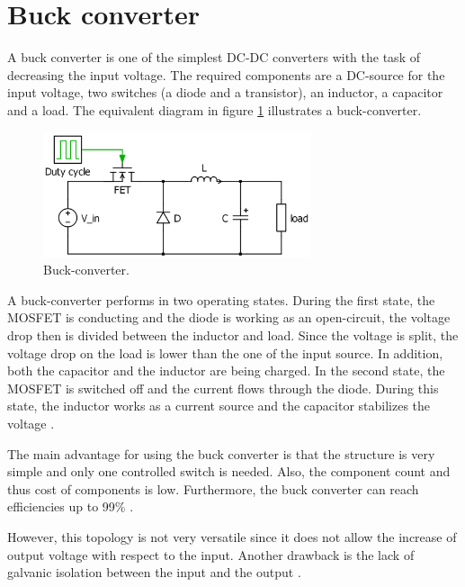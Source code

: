 \section{Buck converter\label{Buck-C}}

A buck converter is one of the simplest DC-DC converters with the task of decreasing the input voltage. The required components are a DC-source for the input voltage, two switches (a diode and a transistor), an inductor, a capacitor and a load. The equivalent diagram in figure \ref{Buck-converter} illustrates a buck-converter. 

\begin{figure}[htbp]
	\begin{center}
		\includegraphics[width=0.7\textwidth]{../Pictures/Buck-converter}
		\caption{Buck-converter.}
		\label{Buck-converter}
	\end{center}	
\end{figure}

A buck-converter performs in two operating states. 
During the first state, the MOSFET is conducting and the diode is working as an open-circuit, the voltage drop  then is divided between the inductor and load. Since the voltage is split, the voltage drop on the load is lower than the one of the input source. In addition, both the capacitor and the inductor are being charged. In the second state, the MOSFET is switched off and the current flows through the diode. During this state, the inductor works as a current source and the capacitor stabilizes the voltage \cite{schematicbuckandboost}.

The main advantage for using the buck converter is that the structure is very simple and only one controlled  switch is needed. Also, the component count and thus cost of components is low. Furthermore, the buck converter can reach efficiencies up to 99\% \cite{Efficiencybuck}. 

However, this topology is not very versatile since it does not allow the increase of output voltage with respect to the input. Another drawback is the lack of galvanic isolation between the input and the output \cite{advantagebuck}.

